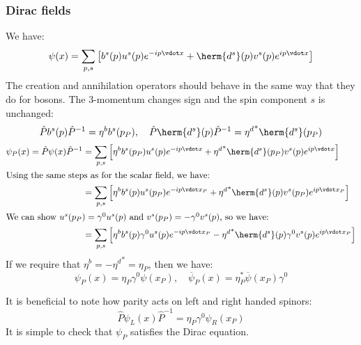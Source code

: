 \documentclass{jknotes}
\begin{document}
\subsubsection*{Dirac fields}
We have:
\begin{equation}
    \psi(x) = \sum_{p,s} \left[ b^s(p) u^s(p) e^{-ip\vdot x} + \herm{d^s}(p)v^s(p)e^{ip\vdot x} \right]
\end{equation}
The creation and annihilation operators should behave in the same way that they do for bosons. The 3-momentum changes sign and the spin component \(s\) is unchanged:
\begin{equation}
    \hat{P}b^s(p)\hat{P}^{-1} = \eta^b b^s(p_P)
    ,\quad
    \hat{P}\herm{d^s}(p)\hat{P}^{-1} = {\eta^d}^* \herm{d^s}(p_P)
\end{equation}
\begin{align}
    \psi_P(x) = \hat{P}\psi(x)\hat{P}^{-1} &= 
    \sum_{p,s}\left[ \eta^b b^s(p_P) u^s(p) e^{-ip\vdot x} + {\eta^d}^* \herm{d^s}(p_P) v^s(p) e^{ip\vdot x} \right] \\
    \intertext{Using the same steps as for the scalar field, we have:}
    &= \sum_{p,s} \left[ \eta^bb^s(p)u^s(p_P) e^{-ip\vdot x_P} + {\eta^d}^*\herm{d^s}(p) v^s(p_P) e^{ip\vdot x_P} \right]\\
    \intertext{We can show \(u^s(p_P) = \gamma^0u^s(p)\) and \(v^s(p_P) = - \gamma^0 v^s(p)\), so we have:}
    &= \sum_{p,s} \left[ \eta^bb^s(p)\gamma^0u^s(p)e^{-ip\vdot x_P} - {\eta^d}^* \herm{d^s}(p)\gamma^0v^s(p)e^{ip\vdot x_P} \right]
\end{align}
If we require that \(\eta^b = - {\eta^d}^* = \eta_P\), then we have:
\begin{equation}
    \psi_P(x) = \eta_P\gamma^0\psi(x_P)
    ,\quad
    \overline{\psi}_P(x) = \eta_P^*\overline{\psi}(x_P)\gamma^0
\end{equation}

It is beneficial to note how parity acts on left and right handed spinors:
\begin{equation}
    \hat{P}\psi_L(x)\hat{P}^{-1} = \eta_P\gamma^0\psi_R(x_P)
\end{equation}
It is simple to check that \(\psi_P\) satisfies the Dirac equation.
\end{document}
